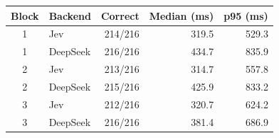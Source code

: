 \begin{tabular}{@{}clrrr@{}}
\toprule
Block & Backend & Correct & Median (ms) & p95 (ms) \\
\midrule
1 & Jev & 214/216 & 319.5 & 529.3 \\
1 & DeepSeek & 216/216 & 434.7 & 835.9 \\
2 & Jev & 213/216 & 314.7 & 557.8 \\
2 & DeepSeek & 215/216 & 425.9 & 833.2 \\
3 & Jev & 212/216 & 320.7 & 624.2 \\
3 & DeepSeek & 216/216 & 381.4 & 686.9 \\
\bottomrule
\end{tabular}
